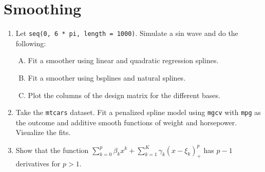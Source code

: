 \documentclass[12pt]{article}
\begin{document}
\section{Smoothing}
\begin{enumerate}
\item Let \texttt{seq(0, 6 * pi, length = 1000)}. Simulate a sin wave and do the
following:
    \begin{enumerate}[A.]
        \item Fit a smoother using linear and quadratic regression splines.
        \item Fit a smoother using bsplines and natural splines.
        \item Plot the columns of the design matrix for the different bases.
    \end{enumerate}
\item Take the \texttt{mtcars} dataset. Fit a penalized spline model using
\texttt{mgcv} with \texttt{mpg} as the outcome and additive smooth functions
of weight and horsepower. Visualize the fits.
\item Show that the function 
$\sum_{k=0}^p \beta_k x^k + \sum_{k=1}^K \gamma_k (x - \xi_k)_+^p$ 
has $p-1$ derivatives for $p>1$. 
\end{enumerate}
\end{document}
